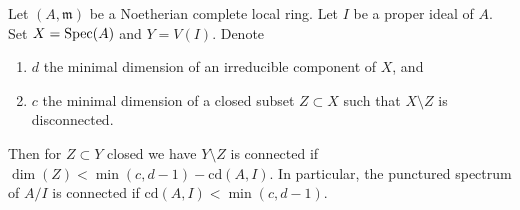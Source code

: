 \begin{lemma}
\label{lemma-punctured-still-connected}
\begin{reference}
\cite[Theorem 1.6]{Varbaro}
\end{reference}
Let $(A, \mathfrak m)$ be a Noetherian complete local ring.
Let $I$ be a proper ideal of $A$.
Set $X = \mathop{\mathrm{Spec}}(A)$ and $Y = V(I)$.
Denote
\begin{enumerate}
\item $d$ the minimal dimension of an irreducible component of $X$, and
\item $c$ the minimal dimension of a closed subset $Z \subset X$
such that $X \setminus Z$ is disconnected.
\end{enumerate}
Then for $Z \subset Y$ closed we have $Y \setminus Z$ is connected if
$\dim(Z) < \min(c, d - 1) - \text{cd}(A, I)$. In particular, the punctured
spectrum of $A/I$ is connected if $\text{cd}(A, I) < \min(c, d - 1)$.
\end{lemma}

